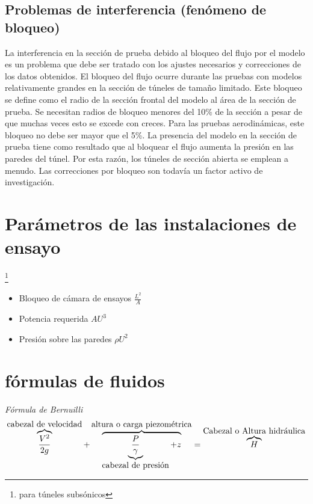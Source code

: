 \documentclass[10pt,a4paper]{article}
\begin{document}
\subsection{Problemas de interferencia (fenómeno de bloqueo)}
La interferencia en la sección de prueba debido al bloqueo del flujo por el modelo es un problema que debe ser tratado con los ajustes necesarios y correcciones de los datos obtenidos. El bloqueo del flujo ocurre durante las pruebas con modelos relativamente grandes en la sección de túneles de tamaño limitado. Este bloqueo se define como el radio de la sección frontal del modelo al área de la sección de prueba. Se necesitan radios de bloqueo menores del 10\% de la sección a pesar de que muchas veces esto se excede con creces. Para las pruebas aerodinámicas, este bloqueo no debe ser mayor que el 5\%. La presencia del modelo en la sección de prueba tiene como resultado que al bloquear el flujo aumenta la presión en las paredes del túnel. Por esta razón, los túneles de sección abierta se emplean a menudo. Las correcciones por bloqueo son todavía un factor activo de investigación.
\section{Parámetros de las instalaciones de ensayo}
\footnote{para túneles subsónicos}
\begin{itemize}
\item
Bloqueo de cámara de ensayos $\frac{L^{2}}{A}$
\item
Potencia requerida $AU^{3}$
\item
Presión sobre las paredes $\rho U^{2}$
\end{itemize}
\section{fórmulas de fluidos}
\textit{Fórmula de Bernuilli}
\begin{equation}
\label{bernu}
\overbrace{{V^2 \over 2 g}}^{\mbox{cabezal de velocidad}}+\overbrace{\underbrace{\frac{P}{\gamma}}_{\mbox{cabezal de presión}} + z}^{\mbox{altura o carga piezométrica}} = \overbrace{H}^{\mbox{Cabezal o Altura hidráulica}}
\end{equation}
\vspace{2cm}
\end{document}

